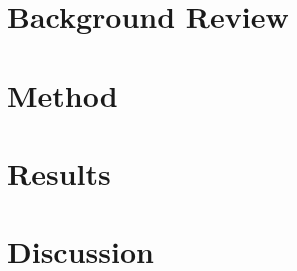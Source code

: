 \documentclass[conference,letterpaper]{IEEEtran}
\begin{document}
\section{Background Review}

\FloatBarrier

\section{Method}

\FloatBarrier

\section{Results}

\FloatBarrier

\section{Discussion}

\FloatBarrier

%

%
\end{document}
